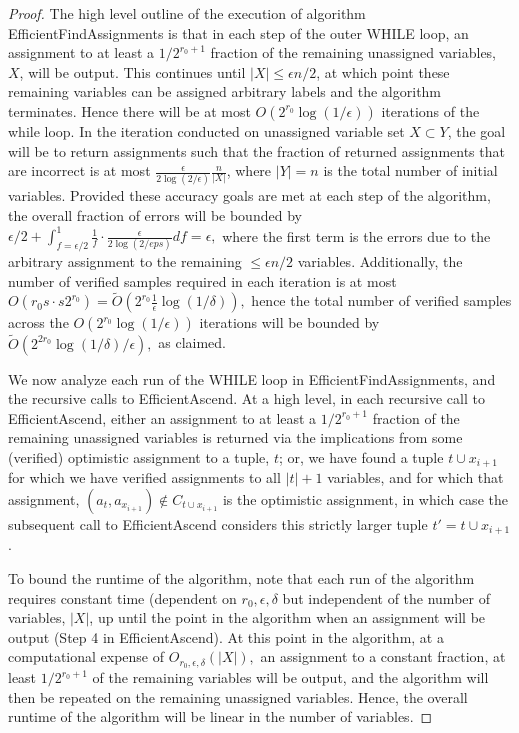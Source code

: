 \documentclass[anon,12pt]{colt2018}
\newcommand{\eps}{\epsilon}
\begin{document}
\begin{proof}
The high level outline of the execution of algorithm EfficientFindAssignments is that in each step of the outer WHILE loop, an assignment to at least a $1/2^{r_0+1}$ fraction of the remaining unassigned variables, $X$, will be output.  This continues until $|X| \le \eps n /2$, at which point these remaining variables can be assigned arbitrary labels and the algorithm terminates.  Hence there will be at most $O\left(2^{r_0} \log(1/\eps)\right)$ iterations of the while loop.   In the iteration conducted on unassigned variable set $X \subset Y$, the goal will be to return assignments such that the fraction of returned assignments that are incorrect is at most $\frac{\eps}{2 \log(2/\eps)}\frac{n}{|X|}$, where $|Y|=n$ is the total number of initial variables.   Provided these accuracy goals are met at each step of the algorithm, the overall fraction of errors will be bounded by $\eps/2 + \int_{f=\eps/2}^1 \frac{1}{f} \cdot \frac{\eps}{2 \log(2/eps)} df = \eps,$ where the first term is the errors due to the arbitrary assignment to the remaining $\le \eps n/2$ variables.   Additionally, the number of verified samples required in each iteration is at most $O(r_0s\cdot s 2^{r_0})=\tilde{O}\left(2^{r_0} \frac{1}{\eps}\log(1/\delta)\right),$ hence the total number of verified samples across the $O\left(2^{r_0} \log(1/\eps)\right)$ iterations will be bounded by $\tilde{O}(2^{2r_0} \log(1/\delta)/\eps),$ as claimed.

We now analyze each run of the WHILE loop in EfficientFindAssignments, and the recursive calls to EfficientAscend.   At a high level, in each recursive call to EfficientAscend, either an assignment to at least a $1/2^{r_0+1}$ fraction of the remaining unassigned variables is returned via the implications from some (verified) optimistic assignment to a tuple, $t$; or, we have found a tuple $t \cup x_{i+1}$ for which we have verified assignments to all $|t|+1$ variables, and for which that assignment, $(a_t,a_{x_{i+1}}) \not \in C_{t \cup x_{i+1}}$ is the optimistic assignment, in which case the subsequent call to EfficientAscend considers this strictly larger tuple $t'=t \cup x_{i+1}$.   

To bound the runtime of the algorithm, note that each run of the algorithm requires constant time (dependent on $r_0,\eps,\delta$ but independent of the number of variables, $|X|$, up until the point in the algorithm when an assignment will be output (Step 4 in EfficientAscend).  At this point in the algorithm, at a computational expense of $O_{r_0,\eps,\delta}(|X|),$ an assignment to a constant fraction, at least $1/2^{r_0+1}$ of the remaining variables will be output, and the algorithm will then be repeated on the remaining unassigned variables.   Hence, the overall runtime of the algorithm will be linear in the number of variables.   


\end{proof}
\end{document}
